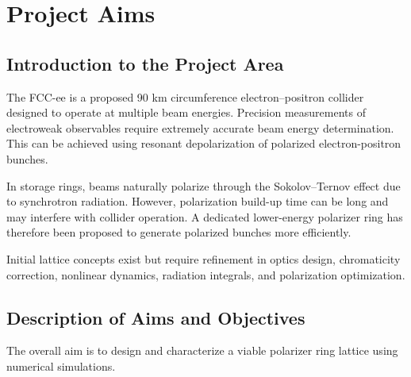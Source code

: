 \documentclass[aip,twocolumn,10pt,graphicx]{revtex4-1}
\begin{document}
\section{Project Aims}
\subsection{Introduction to the Project Area}
The FCC-ee is a proposed 90 km circumference electron–positron collider designed to operate at multiple beam energies. Precision measurements of electroweak observables require extremely accurate beam energy determination. This can be achieved using resonant depolarization of polarized electron-positron bunches.

In storage rings, beams naturally polarize through the Sokolov–Ternov effect due to synchrotron radiation. However, polarization build-up time can be long and may interfere with collider operation. A dedicated lower-energy polarizer ring has therefore been proposed to generate polarized bunches more efficiently.

Initial lattice concepts exist but require refinement in optics design, chromaticity correction, nonlinear dynamics, radiation integrals, and polarization optimization.
\subsection{Description of Aims and Objectives}
The overall aim is to design and characterize a viable polarizer ring lattice using numerical simulations.
\end{document}

